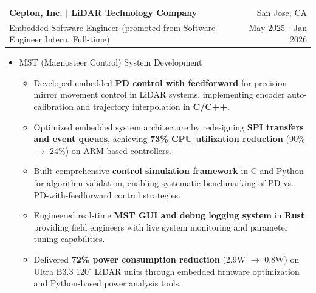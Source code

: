 \documentclass[a4paper,20pt]{article}
\makeatletter
\newcommand{\resumeResearchSubheadingShort}[4]{
  \vspace{4pt}\item
    \begin{tabular*} {0.98\textwidth} {@{\hspace{-0.5em}}l@{\extracolsep{\fill}}r@{}}
      \textbf{#1} & {#2}\null \\
      {#3} & {#4}
    \end{tabular*}
  \vspace{-6pt}
}
\newcommand{\resumeResearchItemListStart}{
  \begin{itemize} [leftmargin=*]
}
\newcommand{\resumeResearchItemListEnd}{
  \end{itemize}
  \vspace{-5pt}
}
\newcommand{\resumeResearchItem}[1]{
  \item{
    {#1 \vspace{-1pt}}
  }
}
\newcommand{\resumeResearchMidItemListStart}{
  \begin{itemize} [leftmargin=*]
}
\newcommand{\resumeResearchMidItemListEnd}{
  \end{itemize}
  \vspace{-8pt}
}
\newcommand{\resumeResearchMidItem}[2]{
  \item{
    \textbf{#1}
    {#2 \vspace{-2pt}}
  }
}
\makeatother
\begin{document}
\resumeResearchSubheadingShort
{Cepton, Inc. \textnormal{\small{$|$ LiDAR Technology Company}}} {San Jose, CA}
{Embedded Software Engineer (promoted from Software Engineer Intern, Full-time)} {May 2025 - Jan 2026}
\resumeResearchMidItemListStart
\resumeResearchMidItem{}
{MST (Magnosteer Control) System Development}
{
  \resumeResearchItemListStart
  \resumeResearchItem{}
  {Developed embedded \textbf{PD control with feedforward} for precision mirror movement control in LiDAR systems, implementing encoder auto-calibration and trajectory interpolation in \textbf{C/C++}.}
  \resumeResearchItem{}
  {Optimized embedded system architecture by redesigning \textbf{SPI transfers and event queues}, achieving \textbf{73\% CPU utilization reduction} (90\% $\rightarrow$ 24\%) on ARM-based controllers.}
  \resumeResearchItem{}
  {Built comprehensive \textbf{control simulation framework} in C and Python for algorithm validation, enabling systematic benchmarking of PD vs. PD-with-feedforward control strategies.}
  \resumeResearchItem{}
  {Engineered real-time \textbf{MST GUI and debug logging system} in \textbf{Rust}, providing field engineers with live system monitoring and parameter tuning capabilities.}
  \resumeResearchItem{}
  {Delivered \textbf{72\% power consumption reduction} (2.9W $\rightarrow$ 0.8W) on Ultra B3.3 120$^\circ$ LiDAR units through embedded firmware optimization and Python-based power analysis tools.}
  \resumeResearchItemListEnd
}
\resumeResearchMidItemListEnd
\end{document}
